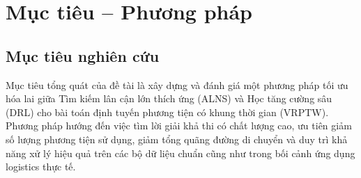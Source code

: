\documentclass[13pt,a4paper]{extarticle}
\begin{document}
\clearpage
\section{Mục tiêu -- Phương pháp}
\subsection{Mục tiêu nghiên cứu}

Mục tiêu tổng quát của đề tài là xây dựng và đánh giá một phương pháp tối ưu hóa lai giữa Tìm kiếm lân cận lớn thích ứng (ALNS) và Học tăng cường sâu (DRL) cho bài toán định tuyến phương tiện có khung thời gian (VRPTW). Phương pháp hướng đến việc tìm lời giải khả thi có chất lượng cao, ưu tiên giảm số lượng phương tiện sử dụng, giảm tổng quãng đường di chuyển và duy trì khả năng xử lý hiệu quả trên các bộ dữ liệu chuẩn cũng như trong bối cảnh ứng dụng logistics thực tế.
\end{document}
